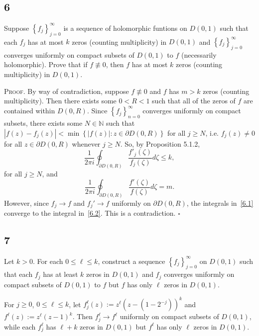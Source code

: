 \documentclass[12pt]{article}
\newcounter{ProofCounter}
\newenvironment{Proof}{\stepcounter{ProofCounter}\textsc{Proof.}}{\hfill$\square$}
\begin{document}
\subsection*{6}
\begin{tcolorbox}
  Suppose $\left\{ f_j \right\}_{j=0}^{\infty}$ is a sequence of holomorphic funtions on $D(0,1)$ such that each $f_j$ has at most $k$ zeros (counting
  multiplicity) in $D(0,1)$ and $\left\{ f_j \right\}_{j=0}^{\infty}$ converges uniformly on compact subsets of $D(0,1)$ to $f$ (necessarily
  holomorphic). Prove that if $f
  \not\equiv 0$, then $f$ has at most $k$ zeros (counting multiplicity) in $D(0,1)$.
\end{tcolorbox}
\begin{Proof}
  By way of contradiction, suppose $f \not\equiv 0$ and $f$ has $m > k$ zeros (counting multiplicity). Then there exists some $0 < R < 1$ such that
  all of the zeros of $f$ are contained within $D(0,R)$. Since $\left\{ f_j \right\}_{n=0}^{\infty}$ converges uniformly on compact subsets, there
  exists some $N \in \mathbb{N}$ such that $|f(z) - f_j(z)| < \min\left\{ |f(z)| : z \in \partial D(0,R) \right\}$ for all $j \geq N$, i.e. $f_j(z) \neq
  0$ for all $z \in \partial D(0,R)$ whenever $j \geq N$. So, by Proposition 5.1.2,
  \begin{equation}
    \frac{1}{2\pi i}\oint_{\partial D(0,R)}\frac{f'_j(\zeta)}{f_j(\zeta)}d\zeta \leq k,
    \label{6.1}
  \end{equation}
  for all $j \geq N$, and 
  \begin{equation}
    \frac{1}{2\pi i}\oint_{\partial D(0,R)}\frac{f'(\zeta)}{f(\zeta)}d\zeta = m.
    \label{6.2}
  \end{equation}
  However, since $f_j \rightarrow f$ and $f_j' \rightarrow f$ uniformly on $\partial D(0,R)$, the integrals in~\eqref{6.1} converge to the integral 
  in~\eqref{6.2}. This is a contradiction.
\end{Proof}

\subsection*{7}
\begin{tcolorbox}
  Let $k > 0$. For each $0 \leq \ell \leq k$, construct a sequence $\left\{ f_j \right\}_{j=0}^{\infty}$ on $D(0,1)$ such that each $f_j$ has at least
  $k$ zeros in $D(0,1)$ and $f_j$ converges uniformly on compact subsets of $D(0,1)$ to $f$ but $f$ has only $\ell$ zeros in $D(0,1)$.
\end{tcolorbox}
For $j \geq 0$, $0 \leq \ell \leq k$, let $f_{j}^{\ell}(z) := z^{\ell}(z - (1 - 2^{-j}))^{k}$ and $f^{\ell}(z) := z^{\ell}(z - 1)^{k}$. Then
$f_{j}^{\ell} \rightarrow f^{\ell}$ uniformly on compact subsets of $D(0,1)$, while each $f_{j}^{\ell}$ has $\ell + k$ zeros in $D(0,1)$ but $f^{\ell}$ 
has only $\ell$ zeros in $D(0,1)$.
\end{document}
